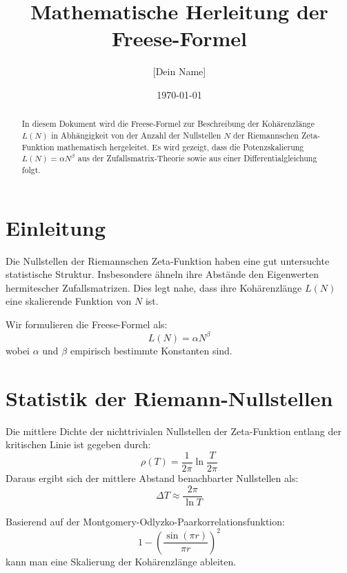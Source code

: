 \documentclass[a4paper,11pt]{article}
\title{Mathematische Herleitung der Freese-Formel}
\author{[Dein Name]}
\date{\today}
\begin{document}
\maketitle

\begin{abstract}
In diesem Dokument wird die Freese-Formel zur Beschreibung der Kohärenzlänge \(L(N)\) in Abhängigkeit von der Anzahl der Nullstellen \(N\) der Riemannschen Zeta-Funktion mathematisch hergeleitet. Es wird gezeigt, dass die Potenzskalierung \(L(N) = \alpha N^\beta\) aus der Zufallsmatrix-Theorie sowie aus einer Differentialgleichung folgt.
\end{abstract}

\section{Einleitung}
Die Nullstellen der Riemannschen Zeta-Funktion haben eine gut untersuchte statistische Struktur. Insbesondere ähneln ihre Abstände den Eigenwerten hermitescher Zufallsmatrizen. Dies legt nahe, dass ihre Kohärenzlänge \(L(N)\) eine skalierende Funktion von \(N\) ist.

Wir formulieren die Freese-Formel als:
\begin{equation}
    L(N) = \alpha N^\beta
\end{equation}
wobei \(\alpha\) und \(\beta\) empirisch bestimmte Konstanten sind.

\section{Statistik der Riemann-Nullstellen}
Die mittlere Dichte der nichttrivialen Nullstellen der Zeta-Funktion entlang der kritischen Linie ist gegeben durch:
\begin{equation}
    \rho(T) = \frac{1}{2\pi} \ln \frac{T}{2\pi}
\end{equation}
Daraus ergibt sich der mittlere Abstand benachbarter Nullstellen als:
\begin{equation}
    \Delta T \approx \frac{2\pi}{\ln T}
\end{equation}

Basierend auf der Montgomery-Odlyzko-Paarkorrelationsfunktion:
\begin{equation}
    1 - \left(\frac{\sin(\pi r)}{\pi r}\right)^2
\end{equation}
kann man eine Skalierung der Kohärenzlänge ableiten.
\end{document}
